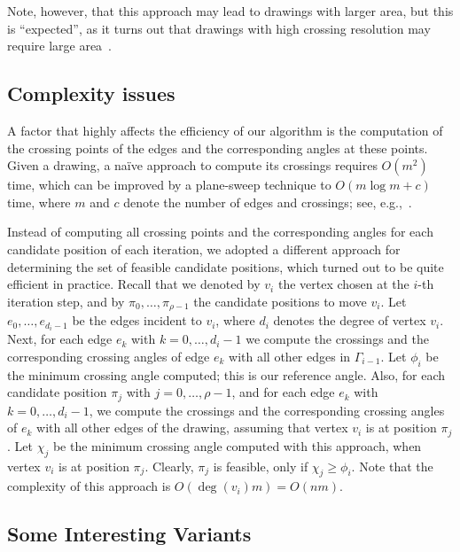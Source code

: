 \documentclass{comjnl}
\begin{document}
Note, however, that this approach may lead to drawings with larger area, but this is ``expected'', as it turns out that drawings with high crossing resolution may require large area~\cite{DBLP:journals/jgaa/AngeliniCDFBKS11,DBLP:journals/tcs/BrandenburgDEKL16}.

\subsection{Complexity issues}
\label{ssec:complexity}

A factor that highly affects the efficiency of our algorithm is the computation of the crossing points of the edges and the corresponding angles at these points. Given  a drawing, a na\"ive approach to compute its crossings requires $O(m^2)$ time, which can be improved by a plane-sweep technique to $O(m \log m + c)$ time, where $m$ and $c$ denote the number of edges and crossings; see, e.g.,~\cite{DBLP:books/lib/BergCKO08}.

Instead of computing all crossing points and the corresponding angles for each candidate position of each iteration, we adopted a different approach for determining the set of feasible candidate positions, which turned out to be quite efficient in practice. Recall that we denoted by $v_i$ the vertex chosen at the $i$-th iteration step, and by $\pi_0,\ldots,\pi_{\rho-1}$ the candidate positions to move $v_i$. Let $e_0,\ldots,e_{d_i-1}$ be the edges incident to $v_i$, where $d_i$ denotes the degree of vertex $v_i$. Next, for each edge $e_k$ with $k=0,\ldots,d_i-1$ we compute the crossings and the corresponding crossing angles of edge $e_k$ with all other edges in $\Gamma_{i-1}$. Let $\phi_i$ be the minimum crossing angle computed; this is our reference angle. Also, for each candidate position $\pi_j$ with $j=0,\ldots,\rho-1$, and for each edge $e_k$ with $k=0,\ldots,d_i-1$, we compute the crossings and the corresponding crossing angles of $e_k$ with all other edges of the drawing, assuming that vertex $v_i$ is at position $\pi_j$. Let $\chi_j$ be the minimum crossing angle computed with this approach, when vertex $v_i$ is at position $\pi_j$. Clearly, $\pi_j$ is feasible, only if $\chi_j \geq \phi_i$. Note that the complexity of this approach is $O(\deg(v_i)m) = O(nm)$.

\subsection{Some Interesting Variants}
\label{ssec:variants}
\end{document}
